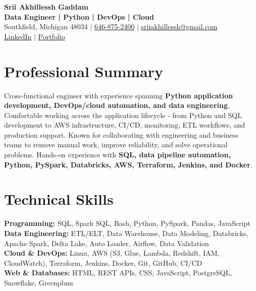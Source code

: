 \documentclass[letterpaper,10pt]{article}
\begin{document}
\fontsize{9.35pt}{10.45pt}\selectfont

\begin{center}
    {\LARGE \textbf{Srii Akhillessh Gaddam}} \\[-1pt]
    \textbf{Data Engineer | Python | DevOps | Cloud} \\[2pt]
    Southfield, Michigan 48034 $|$
    \href{tel:6468752400}{646-875-2400} $|$
    \href{mailto:sriiakhillessh@gmail.com}{sriiakhillessh@gmail.com} \\[1pt]
    \href{https://www.linkedin.com/in/srii-akhiilessh-gaddam-b48668191/}{LinkedIn} $|$
    \href{https://sriiakhillesshg.github.io/portfolio/}{Portfolio}
\end{center}
\vspace{-8pt}

\section{Professional Summary}
\small{Cross-functional engineer with experience spanning \textbf{Python application development, DevOps/cloud automation, and data engineering}. Comfortable working across the application lifecycle - from Python and SQL development to AWS infrastructure, CI/CD, monitoring, ETL workflows, and production support. Known for collaborating with engineering and business teams to remove manual work, improve reliability, and solve operational problems. Hands-on experience with \textbf{SQL, data pipeline automation, Python, PySpark, Databricks, AWS, Terraform, Jenkins, and Docker}.}

\section{Technical Skills}
\small{
\textbf{Programming:} SQL, Spark SQL, Bash, Python, PySpark, Pandas, JavaScript \\
\textbf{Data Engineering:} ETL/ELT, Data Warehouse, Data Modeling, Databricks, Apache Spark, Delta Lake, Auto Loader, Airflow, Data Validation \\
\textbf{Cloud \& DevOps:} Linux, AWS (S3, Glue, Lambda, Redshift, IAM, CloudWatch), Terraform, Jenkins, Docker, Git, GitHub, CI/CD \\
\textbf{Web \& Databases:} HTML, REST APIs, CSS, JavaScript, PostgreSQL, Snowflake, Greenplum
}
\end{document}
